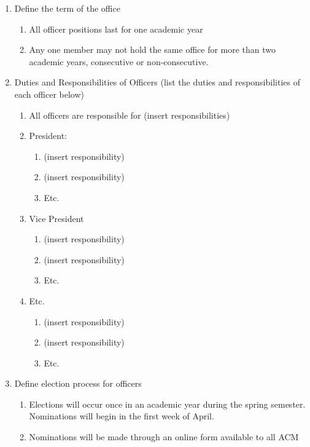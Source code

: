 \documentclass[11pt,a4paper,notitlepage]{article}
\begin{document}
\begin{enumerate}[label=\Alph*.]
  \item Define the term of the office
    \begin{enumerate}[label=\arabic*.]
      \item All officer positions last for one academic year
      \item Any one member may not hold the same office for more than two
      academic years, consecutive or non-consecutive.
    \end{enumerate}
  \item Duties and Responsibilities of Officers (list the duties and
  responsibilities of each officer below)
    \begin{enumerate}[label=\arabic*.]
      \item All officers are responsible for (insert responsibilities)
      \item President:
        \begin{enumerate}[label=\alph*.]
          \item (insert responsibility)
          \item (insert responsibility)
          \item Etc.
        \end{enumerate}
      \item Vice President
        \begin{enumerate}[label=\alph*.]
          \item (insert responsibility)
          \item (insert responsibility)
          \item Etc.
        \end{enumerate}
      \item Etc.
        \begin{enumerate}[label=\alph*.]
          \item (insert responsibility)
          \item (insert responsibility)
          \item Etc.
        \end{enumerate}
    \end{enumerate}
  \item Define election process for officers
    \begin{enumerate}[label=\arabic*.]
      \item Elections will occur once in an academic year during the spring
      semester. Nominations will begin in the first week of April.
      \item Nominations will be made through an online form available to all ACM

\end{enumerate}
\end{enumerate}
\end{document}
